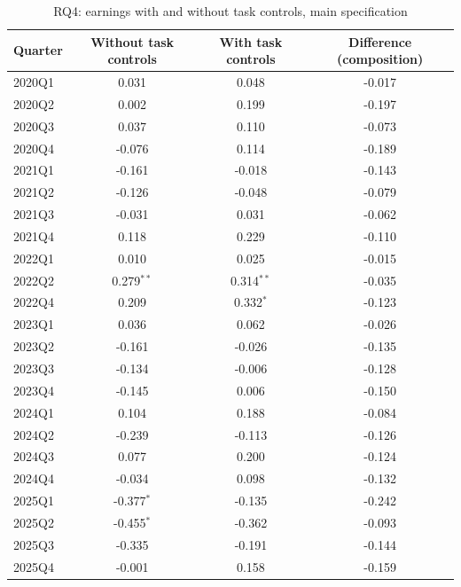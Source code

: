 \begin{table}[htbp]\centering
\caption{RQ4: earnings with and without task controls, main specification}
\begin{tabular}{lccc}
\toprule
Quarter & Without task controls & With task controls & Difference (composition) \\
\midrule
2020Q1 & 0.031 & 0.048 & -0.017 \\
2020Q2 & 0.002 & 0.199 & -0.197 \\
2020Q3 & 0.037 & 0.110 & -0.073 \\
2020Q4 & -0.076 & 0.114 & -0.189 \\
2021Q1 & -0.161 & -0.018 & -0.143 \\
2021Q2 & -0.126 & -0.048 & -0.079 \\
2021Q3 & -0.031 & 0.031 & -0.062 \\
2021Q4 & 0.118 & 0.229 & -0.110 \\
2022Q1 & 0.010 & 0.025 & -0.015 \\
2022Q2 & 0.279$^{**}$ & 0.314$^{**}$ & -0.035 \\
2022Q4 & 0.209 & 0.332$^{*}$ & -0.123 \\
2023Q1 & 0.036 & 0.062 & -0.026 \\
2023Q2 & -0.161 & -0.026 & -0.135 \\
2023Q3 & -0.134 & -0.006 & -0.128 \\
2023Q4 & -0.145 & 0.006 & -0.150 \\
2024Q1 & 0.104 & 0.188 & -0.084 \\
2024Q2 & -0.239 & -0.113 & -0.126 \\
2024Q3 & 0.077 & 0.200 & -0.124 \\
2024Q4 & -0.034 & 0.098 & -0.132 \\
2025Q1 & -0.377$^{*}$ & -0.135 & -0.242 \\
2025Q2 & -0.455$^{*}$ & -0.362 & -0.093 \\
2025Q3 & -0.335 & -0.191 & -0.144 \\
2025Q4 & -0.001 & 0.158 & -0.159 \\
\bottomrule
\end{tabular}
\par\vspace{2pt}{\footnotesize Difference = without minus with task controls; point estimate only. * p<0.10, ** p<0.05, *** p<0.01.}
\end{table}
